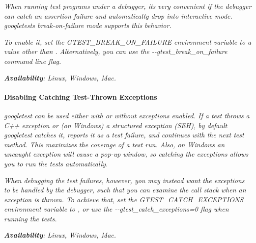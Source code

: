 {\itshape }

{\itshape When running test programs under a debugger, it\textquotesingle{}s very convenient if the debugger can catch an assertion failure and automatically drop into interactive mode. googletest\textquotesingle{}s {\itshape break-\/on-\/failure} mode supports this behavior.}

{\itshape To enable it, set the {\ttfamily G\+T\+E\+S\+T\+\_\+\+B\+R\+E\+A\+K\+\_\+\+O\+N\+\_\+\+F\+A\+I\+L\+U\+RE} environment variable to a value other than {} . Alternatively, you can use the {\ttfamily -\/-\/gtest\+\_\+break\+\_\+on\+\_\+failure} command line flag.}

{\itshape {\bfseries Availability}\+: Linux, Windows, Mac.}

{\itshape \paragraph*{Disabling Catching Test-\/\+Thrown Exceptions}}

{\itshape }

{\itshape googletest can be used either with or without exceptions enabled. If a test throws a C++ exception or (on Windows) a structured exception (S\+EH), by default googletest catches it, reports it as a test failure, and continues with the next test method. This maximizes the coverage of a test run. Also, on Windows an uncaught exception will cause a pop-\/up window, so catching the exceptions allows you to run the tests automatically.}

{\itshape When debugging the test failures, however, you may instead want the exceptions to be handled by the debugger, such that you can examine the call stack when an exception is thrown. To achieve that, set the {\ttfamily G\+T\+E\+S\+T\+\_\+\+C\+A\+T\+C\+H\+\_\+\+E\+X\+C\+E\+P\+T\+I\+O\+NS} environment variable to {}, or use the {\ttfamily -\/-\/gtest\+\_\+catch\+\_\+exceptions=0} flag when running the tests.}

{\itshape {\bfseries Availability}\+: Linux, Windows, Mac. }